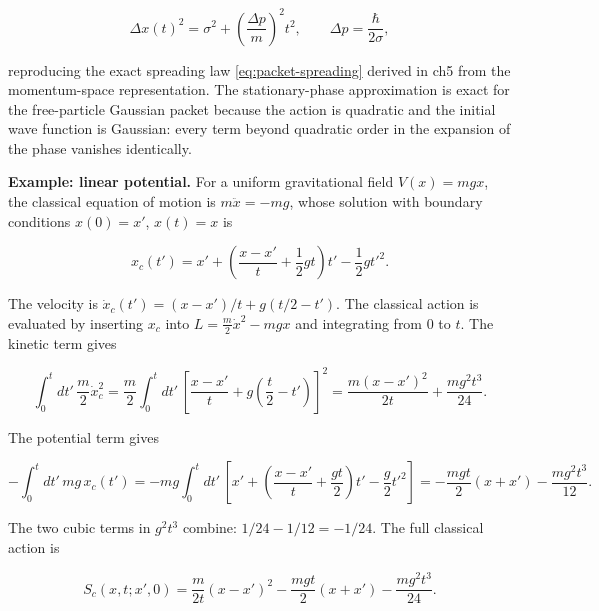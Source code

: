 \begin{linenomath}
\begin{equation}
\Delta x(t)^2 = \sigma^2 + \left(\frac{\Delta p}{m}\right)^2 t^2,
\qquad \Delta p = \frac{\hbar}{2\sigma},
\end{equation}
\end{linenomath}
reproducing the exact spreading law \eqref{eq:packet-spreading} derived in ch5 from the momentum-space representation. The stationary-phase approximation is exact for the free-particle Gaussian packet because the action is quadratic and the initial wave function is Gaussian: every term beyond quadratic order in the expansion of the phase vanishes identically.

\medskip\noindent\textbf{Example: linear potential.}
For a uniform gravitational field $V(x) = mgx$, the classical equation of motion is $m\ddot{x} = -mg$, whose solution with boundary conditions $x(0) = x'$, $x(t) = x$ is
\begin{linenomath}
\begin{equation}
x_c(t') = x' + \left(\frac{x - x'}{t} + \frac{1}{2}gt\right)t' - \frac{1}{2}g t'^2.
\end{equation}
\end{linenomath}
The velocity is $\dot{x}_c(t') = (x-x')/t + g(t/2 - t')$. The classical action is evaluated by inserting $x_c$ into $L = \frac{m}{2}\dot{x}^2 - mgx$ and integrating from $0$ to $t$. The kinetic term gives
\begin{linenomath}
\begin{equation}
\int_0^t dt'\,\frac{m}{2}\dot{x}_c^2
= \frac{m}{2}\int_0^t dt'\,\left[\frac{x-x'}{t} + g\left(\frac{t}{2} - t'\right)\right]^2
= \frac{m(x-x')^2}{2t} + \frac{mg^2 t^3}{24}.
\end{equation}
\end{linenomath}
The potential term gives
\begin{linenomath}
\begin{equation}
-\int_0^t dt'\, mg\,x_c(t')
= -mg\int_0^t dt'\,\left[x' + \left(\frac{x-x'}{t}+\frac{gt}{2}\right)t' - \frac{g}{2}t'^2\right]
= -\frac{mgt}{2}(x+x') - \frac{mg^2 t^3}{12}.
\end{equation}
\end{linenomath}
The two cubic terms in $g^2 t^3$ combine: $1/24 - 1/12 = -1/24$. The full classical action is
\begin{linenomath}
\begin{equation}
S_c(x,t;x',0) = \frac{m}{2t}(x-x')^2 - \frac{mgt}{2}(x+x') - \frac{mg^2 t^3}{24}.
\label{eq:linear-potential-action}
\end{equation}
\end{linenomath}
